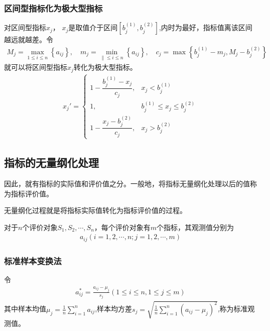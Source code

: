 \documentclass[letterpaper,10pt,english]{sphinxmanual}
\begin{document}
\subsubsection{区间型指标化为极大型指标}
\label{\detokenize{docs/evaluation_model:id10}}
对区间型指标\(x_j\)， \(x_j\)是取值介于区间\(\left[b_{j}^{(1)}, b_{j}^{(2)}\right]\),内时为最好，指标值离该区间越远就越差。令
\begin{equation*}
\begin{split}
M_{j}=\max _{1 \leq i \leq n}\left\{a_{i j}\right\}, \quad m_{j}=\min _{\| \leq i \leq n}\left\{a_{i j}\right\}, \quad c_{j}=\max \left\{b_{j}^{(1)}-m_{j}, M_{j}-b_{j}^{(2)}\right\}
\end{split}
\end{equation*}
就可以将区间型指标\(x_j\)转化为极大型指标。
\begin{equation*}
\begin{split}
x_{j}'=\left\{\begin{array}{lll}
{1-\dfrac{b_{j}^{(1)}-x_{j}}{c_{j}},} & {x_{j} < b_{j}^{(1)}} \\
{1,} & {b_{j}^{(1)} \leq x_{j} \leq b_{j}^{(2)}} \\
{1-\dfrac{x_{j}-b_{j}^{(2)}}{c_{j}},} & {x_{j} > b_{j}^{(2)}}
\end{array}\right.
\end{split}
\end{equation*}

\subsection{指标的无量纲化处理}
\label{\detokenize{docs/evaluation_model:content-choose-3}}\label{\detokenize{docs/evaluation_model:id11}}

因此，就有指标的实际值和评价值之分。一般地，将指标无量纲化处理以后的值称为指标评价值。

无量纲化过程就是将指标实际值转化为指标评价值的过程。

对于\(n\)个评价对象\(S_{1}, S_{2}, \cdots, S_{n}\)，每个评价对象有\(m\)个指标，其观测值分别为
\begin{equation*}
\begin{split}
a_{i j}(i=1,2, \cdots, n ; j=1,2, \cdots, m)
\end{split}
\end{equation*}

\subsubsection{标准样本变换法}
\label{\detokenize{docs/evaluation_model:id12}}
令
\begin{equation*}
\begin{split}
a_{i j}^{*}=\frac{a_{i j}-\mu_{j}}{s_{j}}(1 \leq i \leq n, 1 \leq j \leq m)
\end{split}
\end{equation*}
其中样本均值\(\mu_{j}=\frac{1}{n} \sum_{i=1}^{n} a_{i j}\),样本均方差\(s_{j}=\sqrt{\frac{1}{n} \sum_{i=1}^{n}\left(a_{i j}-\mu_{j}\right)^{2}}\),称为标准观测值。
\end{document}
